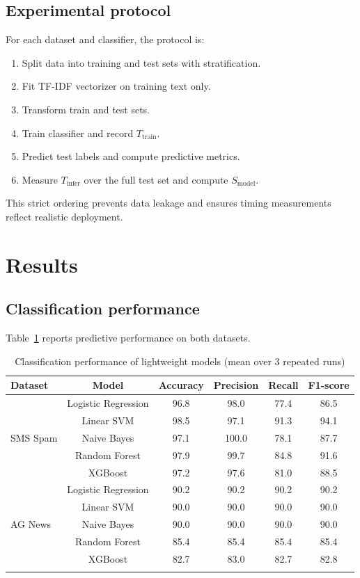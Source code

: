 \documentclass[pdflatex,sn-mathphys-num]{sn-jnl}
\begin{document}
\subsection{Experimental protocol}

For each dataset and classifier, the protocol is:
\begin{enumerate}
    \item Split data into training and test sets with stratification.
    \item Fit TF-IDF vectorizer on training text only.
    \item Transform train and test sets.
    \item Train classifier and record $T_{\text{train}}$.
    \item Predict test labels and compute predictive metrics.
    \item Measure $T_{\text{infer}}$ over the full test set and compute $S_{\text{model}}$.
\end{enumerate}

This strict ordering prevents data leakage and ensures timing measurements reflect realistic deployment.

\section{Results}\label{sec:results}

\subsection{Classification performance}

Table~\ref{tab:classification} reports predictive performance on both datasets.

\begin{table}[t]
\caption{Classification performance of lightweight models (mean over 3 repeated runs)}\label{tab:classification}
\begin{tabular*}{\textwidth}{@{\extracolsep\fill}lccccc}
\toprule
Dataset & Model & Accuracy & Precision & Recall & F1-score \\
\midrule
\multirow{5}{*}{SMS Spam}
 & Logistic Regression & 96.8 & 98.0 & 77.4 & 86.5 \\
 & Linear SVM          & 98.5 & 97.1 & 91.3 & 94.1 \\
 & Naive Bayes         & 97.1 & 100.0 & 78.1 & 87.7 \\
 & Random Forest       & 97.9 & 99.7 & 84.8 & 91.6 \\
 & XGBoost             & 97.2 & 97.6 & 81.0 & 88.5 \\
\midrule
\multirow{5}{*}{AG News}
 & Logistic Regression & 90.2 & 90.2 & 90.2 & 90.2 \\
 & Linear SVM          & 90.0 & 90.0 & 90.0 & 90.0 \\
 & Naive Bayes         & 90.0 & 90.0 & 90.0 & 90.0 \\
 & Random Forest       & 85.4 & 85.4 & 85.4 & 85.4 \\
 & XGBoost             & 82.7 & 83.0 & 82.7 & 82.8 \\
\botrule
\end{tabular*}
\end{table}
\end{document}
